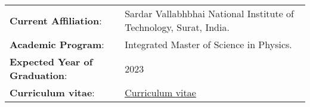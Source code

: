 \begin{tabular}{P{0.25\textwidth} P{0.7\textwidth}}
    \textbf{Current Affiliation}: & Sardar Vallabhbhai National Institute of Technology, Surat, India. \\
    \textbf{Academic Program}: & Integrated Master of Science in Physics. \\
    \textbf{Expected Year of Graduation}: & 2023 \\
    \textbf{Curriculum vitae}: &  \href{https://github.com/devanshshukla99/devanshshukla99/blob/ff7d9d9bbd5e70345af307bd22dce285b77fc72a/cv/cv_devanshshukla99.pdf}{Curriculum vitae} \\
\end{tabular}
